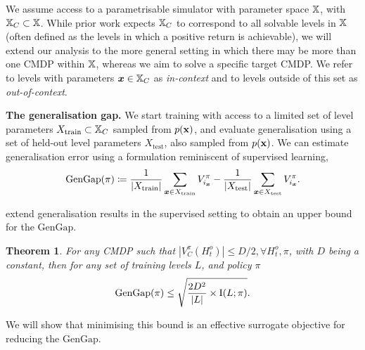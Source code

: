 \documentclass{article}
\theoremstyle{plain}
\newtheorem{theorem}{Theorem}[section]
\theoremstyle{definition}
\theoremstyle{remark}
\begin{document}
We assume access to a parametrisable simulator with parameter space ${\mathbb{X}}$, with ${\mathbb{X}}_C \subset {\mathbb{X}}$. While prior work expects ${\mathbb{X}}_C$ to correspond to all solvable levels in ${\mathbb{X}}$ (often defined as the levels in which a positive return is achievable), we will extend our analysis to the more general setting in which there may be more than one CMDP within ${\mathbb{X}}$, whereas we aim to solve a specific target CMDP. We refer to levels with parameters ${\bm{x}} \in {\mathbb{X}}_C$ as \textit{in-context} and to levels outside of this set as \textit{out-of-context}.

\textbf{The generalisation gap.} We start training with access to a limited set of level parameters $X_{\text{train}}\subset {\mathbb{X}}_C$ sampled from $p({\mathbf{x}})$, and evaluate generalisation using a set of held-out level parameters $X_{\text{test}}$, also sampled from $p({\mathbf{x}})$. We can estimate generalisation error using a formulation reminiscent of supervised learning,
\begin{equation} \label{eq:GenGap}
    \text{GenGap}(\pi) \coloneqq \frac{1}{|X_{\text{train}}|} \sum_{{\bm{x}} \in X_{\text{train}}} V^\pi_{i_{\bm{x}}} - \frac{1}{|X_{\text{test}}|}\sum_{{\bm{x}} \in X_{\text{test}}} V^\pi_{i_{\bm{x}}}.
\end{equation}

\citet{instance_invariant} extend generalisation results in the supervised setting \citep{MI_gengap_SL} to obtain an upper bound for the $\text{GenGap}$. 
\begin{theorem}\label{th:gen_gap}
  For any CMDP such that $|V^\pi_C (H_t^o)| \leq D/2,\forall H_t^o, \pi$, with $D$ being a constant, then for any set of training levels $L$, and policy $\pi$
\begin{equation}\label{eq:GenGap_bound}
   \text{GenGap}(\pi) \leq \sqrt{\frac{2D^2}{|L|} \times \text{I}(L;\pi)}.
\end{equation}   
\end{theorem}
We will show that minimising this bound is an effective surrogate objective for reducing the $\text{GenGap}$. 
\end{document}
